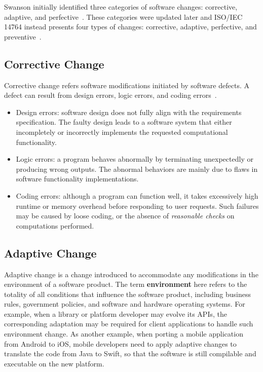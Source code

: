 Swanson initially identified three categories of software changes: corrective, adaptive, and perfective~\cite{Swanson1976:Dimension}. These categories were updated later and ISO/IEC 14764 instead presents four types of changes: corrective, adaptive, perfective, and preventive~\cite{iso}.

\subsection{Corrective Change} 
Corrective change refers software modifications initiated by software defects. A defect can result from design errors, logic errors, and coding errors~\cite{Longstreet1990:smc}.

\begin{itemize}
\item Design errors: software design does not fully align with the requirements specification. The faulty design leads to a software system that either incompletely or incorrectly implements the requested computational functionality. 
\item Logic errors: a program behaves abnormally by terminating unexpectedly or producing wrong outputs. The abnormal behaviors are mainly due to flaws in software functionality implementations.
\item Coding errors: although a program can function well, it takes excessively high runtime or memory overhead before responding to user requests. Such failures may be caused by loose coding, or the absence of {\em reasonable checks} on computations performed.
\end{itemize}

\subsection{Adaptive Change}
Adaptive change is a change introduced to accommodate any modifications in the environment of a software product. The term \textbf{environment} here refers to the totality of all conditions that influence the software product, including business rules, government policies, and software and hardware operating systems. For example, when a library or platform developer may evolve its APIs, the corresponding adaptation may be required for client applications to handle such environment change. As another example, when porting a mobile application from Android to iOS, mobile developers need to apply adaptive changes to translate the code from Java to Swift, so that the software is still compilable and executable on the new platform.  
